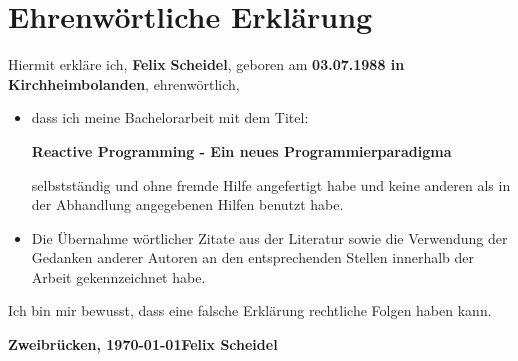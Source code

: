 \chapter*{Ehrenw\"ortliche Erkl\"arung}
Hiermit erkl\"are ich, \textbf{Felix} \textbf{Scheidel}, geboren am
\textbf{03.07.1988 in Kirchheimbolanden}, ehrenw\"ortlich,
\begin{itemize}
\item dass ich meine Bachelorarbeit mit dem Titel:

\textbf{Reactive Programming - Ein neues Programmierparadigma}

selbstst\"andig und ohne fremde Hilfe angefertigt habe und keine anderen als in der
Abhandlung angegebenen Hilfen benutzt habe.
\item Die \"Ubernahme w\"ortlicher Zitate aus der Literatur
sowie die Verwendung der Gedanken anderer Autoren an den entsprechenden
Stellen innerhalb der Arbeit gekennzeichnet habe.
\end{itemize}
Ich bin mir bewusst, dass eine falsche Erkl\"arung rechtliche Folgen haben kann.
\vspace*{3cm}

\textbf{Zweibr\"ucken, \today}\hfill\textbf{Felix Scheidel}
